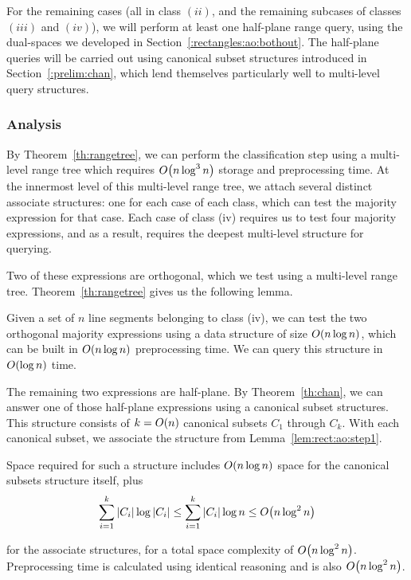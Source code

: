 For the remaining cases (all in class $(ii)$, and the remaining subcases of classes $(iii)$ and $(iv)$), we will perform at least one half-plane range query, using the dual-spaces we developed in Section~\ref{:rectangles:ao:bothout}. The half-plane queries will be carried out using canonical subset structures introduced in Section~\ref{:prelim:chan}, which lend themselves particularly well to multi-level query structures.


\subsubsection{Analysis}

By Theorem~\ref{th:rangetree}, we can perform the classification step using a multi-level range tree which requires $O\!\left(n\log^3{n}\right)$ storage and preprocessing time.  At the innermost level of this multi-level range tree, we attach several distinct associate structures: one for each case of each class, which can test the majority expression for that case. Each case of class (iv) requires us to test four majority expressions, and as a result, requires the deepest multi-level structure for querying.  

Two of these expressions are orthogonal, which we test using a multi-level range tree. Theorem~\ref{th:rangetree} gives us the following lemma.

\begin{lemma}
\label{lem:rect:ao:step1}
Given a set of $n$ line segments belonging to class (iv), we can test the two orthogonal majority expressions using a data structure of size $O\!\left(n\log{n}\right)$, which can be built in $O\!\left(n\log{n}\right)$ preprocessing time. We can query this structure in $O\!\left(\log{n}\right)$ time.
\end{lemma}

The remaining two expressions are half-plane. By Theorem~\ref{th:chan}, we can answer one of those half-plane expressions using a canonical subset structures. This structure consists of $k = O\!\left(n\right)$ canonical subsets $C_1$ through $C_k$. With each canonical subset, we associate the structure from Lemma~\ref{lem:rect:ao:step1}.

Space required for such a structure includes $O\!\left(n \log{n}\right)$ space for the canonical subsets structure itself, plus
\[
\sum_{i=1}^k{|C_i| \log{|C_i|}}
\leq \sum_{i=1}^k{|C_i| \log{n}} 
\leq O\!\left(n\log^2{n}\right)
\]

\noindent for the associate structures, for a total space complexity of $O\!\left(n\log^2{n}\right)$. Preprocessing time is calculated using identical reasoning and is also $O\!\left(n\log^2{n}\right)$.

